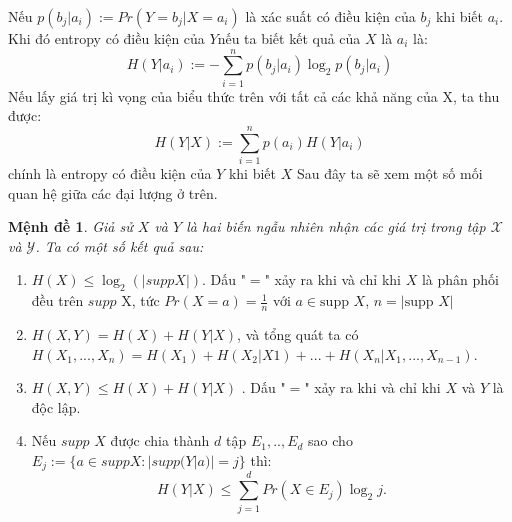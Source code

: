 \documentclass[a4paper, 12pt]{report}
\newtheorem{Proposition}{Mệnh đề } %
\begin{document}
Nếu \(p(b_{j}|a_{i}):= Pr(Y=b_{j}|X=a_{i})\) là xác suất có điều kiện của $b_j$ khi biết $a_i$. Khi đó entropy có điều kiện của \(Y\)nếu ta biết kết quả của \(X\) là \(a_{i}\) là:
\begin{equation*}
    H(Y|a_{i}) := -\sum_{i=1}^{n}p(b_{j}|a_{i})\log_{2}p(b_{j}|a_{i})
\end{equation*}
Nếu lấy giá trị kì vọng của biểu thức trên với tất cả các khả năng của X, ta thu được:
\begin{equation*}
    H(Y|X) := \sum_{i=1}^{n}p(a_{i})H(Y|a_{i})
\end{equation*}
chính là entropy có điều kiện của $Y$ khi biết $X$
Sau đây ta sẽ xem một số mối quan hệ giữa các đại lượng ở trên.
\begin{Proposition}
Giả sử $X$ và $Y$ là hai biến ngẫu nhiên nhận các giá trị trong tập $\mathscr{X}$ và $\mathscr{Y}$. Ta có một số kết quả sau:
\end{Proposition}
\begin{enumerate}[label=\textbf{(\Alph*)}]
\item \(H(X) \leq \log_{2}(|supp X|)\). Dấu "$=$"  xảy ra khi và chỉ khi $X$ là phân phối đều trên $supp \textrm{ X}$, tức $Pr(X=a) = \frac{1}{n}$ với $a \in \textrm{supp }X$, $n=|\textrm{supp }X|$
\item \(H(X,Y) = H(X) + H(Y|X)\), và tổng quát ta có \(H(X_{1},...,X_{n}) = H(X_{1}) + H(X_{2}|X{1}) + ... + H(X_{n}|X_{1},...,X_{n-1})\).
\item \(H(X,Y) \leq H(X) + H(Y|X)\) . Dấu "$=$" xảy ra khi và chỉ khi $X$ và $Y$ là độc lập.
\item Nếu \(supp\) \(X\) được chia thành $d$ tập \(E_{1},..,E_{d}\) sao cho \(E_{j}:= \{a \in suppX : |supp(Y|a)| = j \} \) thì:
\begin{equation*}
    H(Y|X) \leq \sum_{j=1}^{d}Pr(X \in E_{j})\log_{2}j.
\end{equation*}
\end{enumerate}
\end{document}
